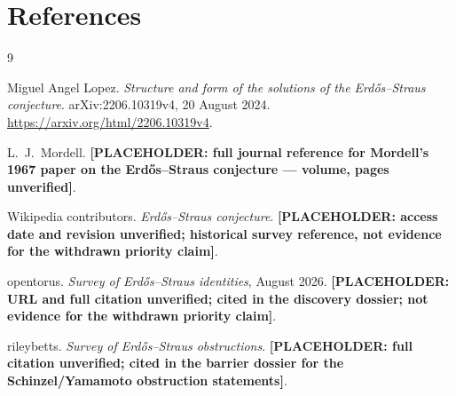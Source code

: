\documentclass[11pt,a4paper]{article}
\theoremstyle{definition}
\begin{document}
\section{References}

\begin{thebibliography}{9}

Miguel Angel Lopez.
\textit{Structure and form of the solutions of the Erd\H{o}s--Straus conjecture}.
arXiv:2206.10319v4, 20 August 2024.
\url{https://arxiv.org/html/2206.10319v4}.

L.~J.~Mordell.
\textbf{[PLACEHOLDER: full journal reference for Mordell's 1967 paper on
the Erd\H{o}s--Straus conjecture --- volume, pages unverified]}.

Wikipedia contributors.
\textit{Erd\H{o}s--Straus conjecture}.
\textbf{[PLACEHOLDER: access date and revision unverified; historical survey
reference, not evidence for the withdrawn priority claim]}.

opentorus.
\textit{Survey of Erd\H{o}s--Straus identities}, August 2026.
\textbf{[PLACEHOLDER: URL and full citation unverified; cited in the
discovery dossier; not evidence for the withdrawn priority claim]}.

rileybetts.
\textit{Survey of Erd\H{o}s--Straus obstructions}.
\textbf{[PLACEHOLDER: full citation unverified; cited in the barrier
dossier for the Schinzel/Yamamoto obstruction statements]}.

\end{thebibliography}
\end{document}
